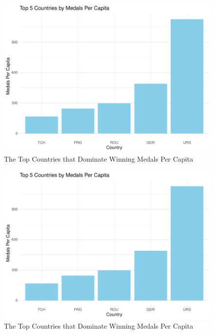 \documentclass[
  12pt,
]{elsarticle}
\begin{document}
\begin{figure}

{\centering \includegraphics{README_files/figure-latex/unnamed-chunk-2-1} 

}

\caption{The Top Countries that Dominate Winning Medals Per Capita\label{Figure2}}\label{fig:unnamed-chunk-2-1}
\end{figure}
\begin{figure}

{\centering \includegraphics{README_files/figure-latex/unnamed-chunk-2-2} 

}

\caption{The Top Countries that Dominate Winning Medals Per Capita\label{Figure2}}\label{fig:unnamed-chunk-2-2}
\end{figure}
\end{document}

